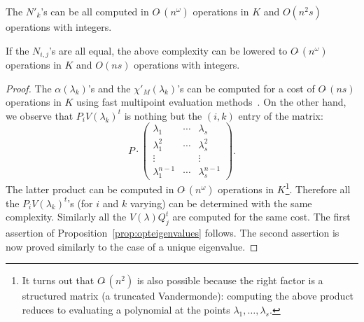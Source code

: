 \documentclass{sig-alternate-05-2015}
\newcommand{\softO}{O\tilde{~}}
\begin{document}
\begin{prop}
\label{prop:opteigenvalues}
The $N'_k$'s can be all computed in $\softO(n^\omega)$ operations
in $K$ and $O(n^2 s)$ operations with integers.

If the $N_{i,j}$'s are all equal, the above complexity can be 
lowered to $\softO(n^\omega)$ operations in $K$ and $O(n s)$ operations 
with integers.
\end{prop}

\begin{proof}
The $\alpha(\lambda_k)$'s and the $\chi'_M(\lambda_k)$'s can be computed 
for a cost of $\softO(ns)$ operations in $K$ using fast multipoint 
evaluation methods~\cite{}.
On the other hand, we observe that $P_i V(\lambda_k)^t$ is nothing but
the $(i,k)$ entry of the matrix:
$$P \cdot \left( \begin{matrix}
\lambda_1 & \cdots & \lambda_s \\
\lambda_1^2 & \cdots & \lambda_s^2 \\
\vdots & & \vdots \\
\lambda_1^{n-1} & \cdots & \lambda_s^{n-1}
\end{matrix} \right).$$
The latter product can be computed in $\softO(n^\omega)$ operations in 
$K$\footnote{It turns out that $\softO(n^2)$ is also possible because
the right factor is a structured matrix (a truncated Vandermonde):
computing the above product reduces to evaluating a polynomial at the
points $\lambda_1, \ldots, \lambda_s$.}. Therefore all the $P_i 
V(\lambda_k)^t$'s (for $i$ and $k$ varying) 
can be determined with the same complexity. 
Similarly all the $V(\lambda) Q_j^t$ are computed for the same cost.
The first assertion of Proposition~\ref{prop:opteigenvalues} follows.
The second assertion is now proved similarly to the case of a unique
eigenvalue.
\end{proof}




\end{document}
